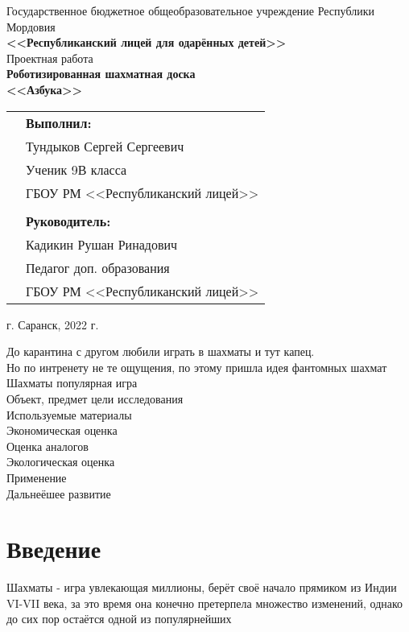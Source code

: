 \documentclass[a4paper]{article}
\begin{document}
  \thispagestyle{empty}
  \begin{center}
    Государственное бюджетное общеобразовательное учреждение Республики Мордовия\\\textbf{<<Республиканский лицей для одарённых детей>>}\\
    \hfill \break
    \hfill \break
    \hfill \break
    \hfill \break
    \hfill \break
    Проектная работа\\
    \textbf{Роботизированная шахматная доска\\<<Азбука>>}
  \end{center}
  \hfill \break
  \hfill \break
  \hfill \break
  \hfill \break
  \hfill \break
  \hfill \break
  \hfill \break
  \hfill \break
  \hfill \break
  \hfill \break
  \begin{tabular}{p{6.1cm}l}
     &\textbf{Выполнил:}\\
     &Тундыков Сергей Сергеевич\\
     &Ученик 9В класса\\
     &ГБОУ РМ <<Республиканский лицей>>\\
     & \\
     &\textbf{Руководитель:}\\
     &Кадикин Рушан Ринадович\\
     &Педагог доп. образования\\
     &ГБОУ РМ <<Республиканский лицей>>\\
  \end{tabular}
  \hfill \break
  \hfill \break
  \begin{center}
    г. Саранск, 2022 г.
  \end{center}
  \newpage
  \tableofcontents
  \newpage
  До карантина с другом любили играть в шахматы и тут капец. \\
  Но по интренету не те ощущения, по этому пришла идея фантомных шахмат \\
  Шахматы популярная игра \\ 
  Объект, предмет цели исследования \\ 
  Используемые материалы \\ 
  Экономическая оценка \\ 
  Оценка аналогов \\ 
  Экологическая оценка \\ 
  Применение \\ 
  Дальнеёшее развитие
  \newpage

  \section{Введение}
  Шахматы - игра увлекающая миллионы, берёт своё начало прямиком из Индии VI-VII века, за это время она конечно претерпела множество изменений, однако до сих пор остаётся одной из популярнейших 
\end{document}
